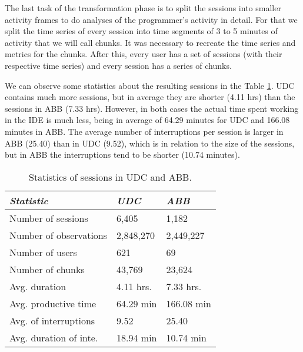 The last task of the transformation phase is to split the sessions into smaller activity frames to do analyses of the programmer's activity in detail. For that we split the time series of every session into time segments of 3 to 5 minutes of activity that we will call chunks. It was necessary to recreate the time series and metrics for the chunks. After this, every user has a set of sessions (with their respective time series) and every session has a series of chunks.

We can observe some statistics about the resulting sessions in the Table \ref{tbl:stats_sessions}. UDC contains much more sessions, but in average they are shorter (4.11 hrs) than the sessions in ABB (7.33 hrs). However, in both cases the actual time spent working in the IDE is much less, being in average of 64.29 minutes for UDC and 166.08 minutes in ABB. The average number of interruptions per session is larger in ABB (25.40) than in UDC (9.52), which is in relation to the size of the sessions, but in ABB the interruptions tend to be shorter (10.74 minutes).

\begin{table}[ht!]
	\small
	\caption{Statistics of sessions in UDC and ABB. }
	\label{tbl:stats_sessions}
	\centering
	\begin{tabular}{p{3.5cm}|p{2cm}|p{2cm}} 
		\hline
		\emph{Statistic} & \emph{UDC} & \emph{ABB} \\
		\hline
		\hline
		Number of sessions & 6,405 & 1,182 \\
		\hline
		Number of observations & 2,848,270 & 2,449,227 \\
		\hline
		Number of users & 621 & 69 \\
		\hline
		Number of chunks & 43,769 & 23,624 \\
		\hline
		Avg. duration & 4.11 hrs. & 7.33 hrs. \\
		\hline
		Avg. productive time & 64.29 min & 166.08 min \\
		\hline
		Avg. of interruptions & 9.52 & 25.40 \\
		\hline
		Avg. duration of inte. & 18.94 min & 10.74 min \\
		\hline
	\end{tabular}
\end{table}
